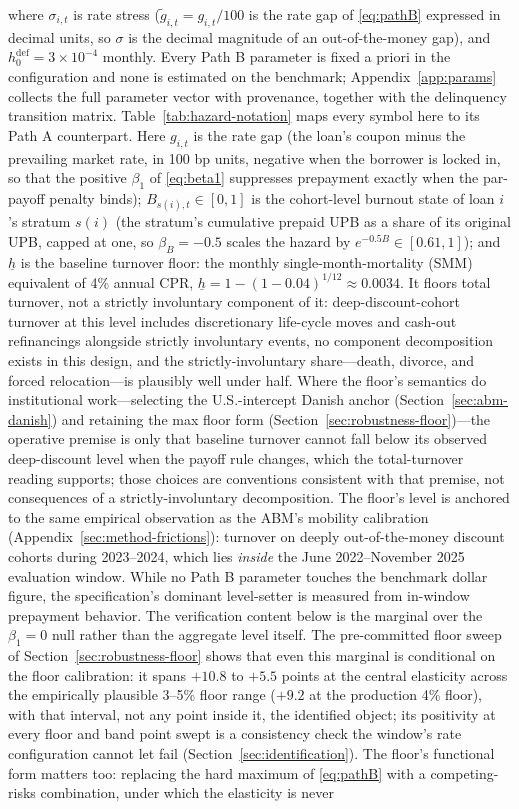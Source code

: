 \documentclass[12pt]{article}
\begin{document}
where $\sigma_{i,t}$ is rate stress ($\tilde g_{i,t} = g_{i,t}/100$ is the rate gap of \eqref{eq:pathB} expressed in decimal units, so $\sigma$ is the decimal magnitude of an out-of-the-money gap), and $h^{\mathrm{def}}_0 = 3\times10^{-4}$ monthly. Every Path B parameter is fixed a priori in the configuration and none is estimated on the benchmark; Appendix~\ref{app:params} collects the full parameter vector with provenance, together with the delinquency transition matrix. Table~\ref{tab:hazard-notation} maps every symbol here to its Path A counterpart. Here $g_{i,t}$ is the rate gap (the loan's coupon minus the prevailing market rate, in 100 bp units, negative when the borrower is locked in, so that the positive $\beta_1$ of \eqref{eq:beta1} suppresses prepayment exactly when the par-payoff penalty binds); $B_{s(i),t} \in [0,1]$ is the cohort-level burnout state of loan $i$'s stratum $s(i)$ (the stratum's cumulative prepaid UPB as a share of its original UPB, capped at one, so $\beta_B = -0.5$ scales the hazard by $e^{-0.5 B} \in [0.61, 1]$); and $\underline{h}$ is the baseline turnover floor: the monthly single-month-mortality (SMM) equivalent of 4\% annual CPR, $\underline{h} = 1-(1-0.04)^{1/12} \approx 0.0034$. It floors total turnover, not a strictly involuntary component of it: deep-discount-cohort turnover at this level includes discretionary life-cycle moves and cash-out refinancings alongside strictly involuntary events, no component decomposition exists in this design, and the strictly-involuntary share---death, divorce, and forced relocation---is plausibly well under half. Where the floor's semantics do institutional work---selecting the U.S.-intercept Danish anchor (Section~\ref{sec:abm-danish}) and retaining the max floor form (Section~\ref{sec:robustness-floor})---the operative premise is only that baseline turnover cannot fall below its observed deep-discount level when the payoff rule changes, which the total-turnover reading supports; those choices are conventions consistent with that premise, not consequences of a strictly-involuntary decomposition. The floor's level is anchored to the same empirical observation as the ABM's mobility calibration (Appendix~\ref{sec:method-frictions}): turnover on deeply out-of-the-money discount cohorts during 2023--2024, which lies \emph{inside} the June 2022--November 2025 evaluation window. While no Path B parameter touches the benchmark dollar figure, the specification's dominant level-setter is measured from in-window prepayment behavior. The verification content below is the marginal over the $\beta_1 = 0$ null rather than the aggregate level itself. The pre-committed floor sweep of Section~\ref{sec:robustness-floor} shows that even this marginal is conditional on the floor calibration: it spans $+10.8$ to $+5.5$ points at the central elasticity across the empirically plausible 3--5\% floor range ($+9.2$ at the production 4\% floor), with that interval, not any point inside it, the identified object; its positivity at every floor and band point swept is a consistency check the window's rate configuration cannot let fail (Section~\ref{sec:identification}). The floor's functional form matters too: replacing the hard maximum of \eqref{eq:pathB} with a competing-risks combination, under which the elasticity is never 
\end{document}
